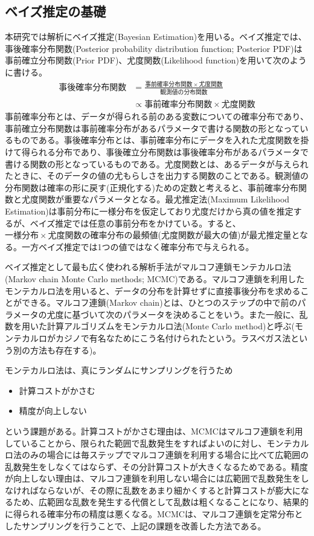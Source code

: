 \subsection{ベイズ推定の基礎 \label{ベイズ推定の基礎}}
本研究では解析にベイズ推定(Bayesian Estimation)を用いる。ベイズ推定では、事後確率分布関数(Posterior probability distribution function; Posterior PDF)は事前確立分布関数(Prior PDF)、尤度関数(Likelihood function)を用いて次のように書ける。
\begin{align}
	事後確率分布関数 &= \frac{事前確率分布関数 \times 尤度関数}{観測値の分布関数} \\
			&\propto 事前確率分布関数 \times 尤度関数
\end{align}
事前確率分布とは、データが得られる前のある変数についての確率分布であり、事前確立分布関数は事前確率分布があるパラメータで書ける関数の形となっているものである。事後確率分布とは、事前確率分布にデータを入れた尤度関数を掛けて得られる分布であり、事後確立分布関数は事後確率分布があるパラメータで書ける関数の形となっているものである。尤度関数とは、あるデータが与えられたときに、そのデータの値の尤もらしさを出力する関数のことである。観測値の分布関数は確率の形に戻す(正規化する)ための定数と考えると、事前確率分布関数と尤度関数が重要なパラメータとなる。最尤推定法(Maximum Likelihood Estimation)は事前分布に一様分布を仮定しており尤度だけから真の値を推定するが、ベイズ推定では任意の事前分布をかけている。すると、$一様分布 \times 尤度関数$の確率分布の最頻値(尤度関数が最大の値)が最尤推定量となる。一方ベイズ推定では1つの値ではなく確率分布で与えられる。

ベイズ推定として最も広く使われる解析手法がマルコフ連鎖モンテカルロ法(Markov chain Monte Carlo methods; MCMC)である。マルコフ連鎖を利用したモンテカルロ法を用いると、データの分布を計算せずに直接事後分布を求めることができる。マルコフ連鎖(Markov chain)とは、ひとつのステップの中で前のパラメータの尤度に基づいて次のパラメータを決めることをいう。また一般に、乱数を用いた計算アルゴリズムをモンテカルロ法(Monte Carlo method)と呼ぶ(モンテカルロがカジノで有名なためにこう名付けられたという。ラスベガス法という別の方法も存在する)。

モンテカルロ法は、真にランダムにサンプリングを行うため
\begin{itemize}
	\item{計算コストがかさむ}
	\item{精度が向上しない}
\end{itemize}
という課題がある。計算コストがかさむ理由は、MCMCはマルコフ連鎖を利用していることから、限られた範囲で乱数発生をすればよいのに対し、モンテカルロ法のみの場合には毎ステップでマルコフ連鎖を利用する場合に比べて広範囲の乱数発生をしなくてはならず、その分計算コストが大きくなるためである。精度が向上しない理由は、マルコフ連鎖を利用しない場合には広範囲で乱数発生をしなければならないが、その際に乱数をあまり細かくすると計算コストが膨大になるため、広範囲な乱数を発生する代償として乱数は粗くなることになり、結果的に得られる確率分布の精度は悪くなる。MCMCは、マルコフ連鎖を定常分布としたサンプリングを行うことで、上記の課題を改善した方法である。

